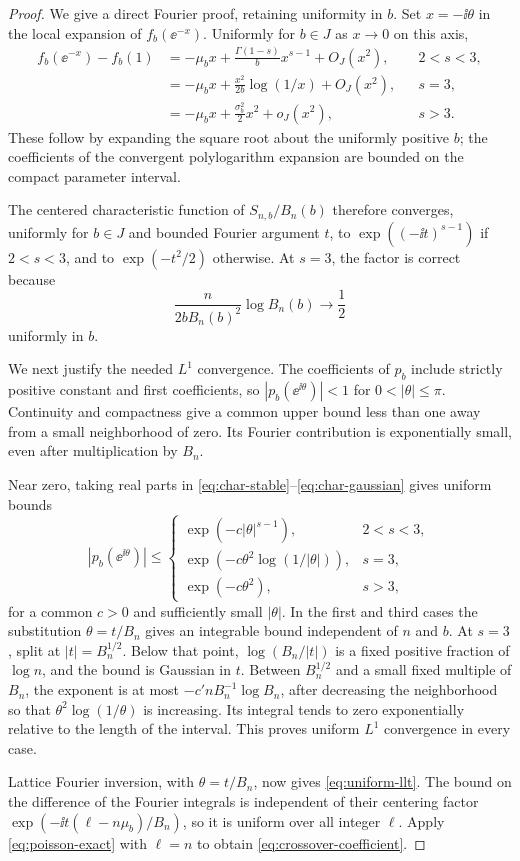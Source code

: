 \begin{proof}
We give a direct Fourier proof, retaining uniformity in $b$.
Set $x=-\ii\theta$ in the local expansion of $f_b(\ee^{-x})$.
Uniformly for $b\in J$ as $x\to0$ on this axis,
\begin{align}
 f_b(\ee^{-x})-f_b(1)
 &=-\mu_b x+\frac{\Gamma(1-s)}b x^{s-1}+O_J(x^2),
 &&2<s<3,\label{eq:char-stable}\\
 &=-\mu_b x+\frac{x^2}{2b}\log(1/x)+O_J(x^2),
 &&s=3,\label{eq:char-marginal}\\
 &=-\mu_b x+\frac{\sigma_b^2}{2}x^2+o_J(x^2),
 &&s>3.\label{eq:char-gaussian}
\end{align}
These follow by expanding the square root about the uniformly
positive $b$; the coefficients of the convergent polylogarithm
expansion are bounded on the compact parameter interval.

The centered characteristic function of $S_{n,b}/B_n(b)$ therefore
converges, uniformly for $b\in J$ and bounded Fourier argument $t$,
to $\exp((-\ii t)^{s-1})$ if $2<s<3$, and to
$\exp(-t^2/2)$ otherwise.  At $s=3$, the factor is correct because
\[
 \frac{n}{2bB_n(b)^2}\log B_n(b)\longrightarrow\frac12
\]
uniformly in $b$.

We next justify the needed $L^1$ convergence.  The coefficients of
$p_b$ include strictly positive constant and first coefficients, so
$|p_b(\ee^{\ii\theta})|<1$ for $0<|\theta|\le\pi$.
Continuity and compactness give a common upper bound less than one
away from a small neighborhood of zero.  Its Fourier contribution
is exponentially small, even after multiplication by $B_n$.

Near zero, taking real parts in
\eqref{eq:char-stable}--\eqref{eq:char-gaussian} gives uniform bounds
\[
 |p_b(\ee^{\ii\theta})|
 \le
 \begin{cases}
  \exp(-c|\theta|^{s-1}),&2<s<3,\\
  \exp(-c\theta^2\log(1/|\theta|)),&s=3,\\
  \exp(-c\theta^2),&s>3,
 \end{cases}
\]
for a common $c>0$ and sufficiently small $|\theta|$.
In the first and third cases the substitution $\theta=t/B_n$
gives an integrable bound independent of $n$ and $b$.
At $s=3$, split at $|t|=B_n^{1/2}$.  Below that point,
$\log(B_n/|t|)$ is a fixed positive fraction of $\log n$, and
the bound is Gaussian in $t$.  Between $B_n^{1/2}$ and a small
fixed multiple of $B_n$, the exponent is at most
$-c' nB_n^{-1}\log B_n$, after decreasing the neighborhood so
that $\theta^2\log(1/\theta)$ is increasing.  Its integral tends
to zero exponentially relative to the length of the interval.
This proves uniform $L^1$ convergence in every case.

Lattice Fourier inversion, with $\theta=t/B_n$, now gives
\eqref{eq:uniform-llt}.  The bound on the difference of the
Fourier integrals is independent of their centering factor
$\exp(-\ii t(\ell-n\mu_b)/B_n)$, so it is uniform over all
integer $\ell$.  Apply \eqref{eq:poisson-exact} with $\ell=n$
to obtain \eqref{eq:crossover-coefficient}.
\end{proof}

